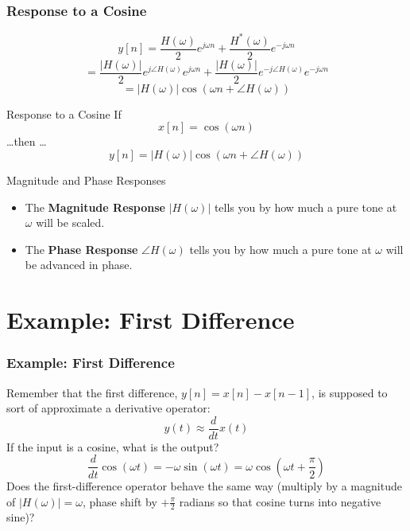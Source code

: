 \documentclass{beamer}
\begin{document}
\begin{frame}
  \frametitle{Response to a Cosine}
  \[
  y[n] = \frac{H(\omega)}{2}e^{j\omega n}+\frac{H^*(\omega)}{2}e^{-j\omega n}
  \]
  \[
  = \frac{|H(\omega)|}{2}e^{j\angle H(\omega)}e^{j\omega n} + 
  \frac{|H(\omega)|}{2}e^{-j\angle H(\omega)}e^{-j\omega n}
  \]
  \[
  = |H(\omega)|\cos\left(\omega n+\angle H(\omega)\right)
  \]
\end{frame}


\begin{frame}
  \begin{block}{Response to a Cosine}
    If
    \[
    x[n] = \cos(\omega n)
    \]
    \ldots then \ldots
    \[
    y[n] = |H(\omega)|\cos\left(\omega n+\angle H(\omega)\right)
    \]
  \end{block}
  \begin{block}{Magnitude and Phase Responses}
    \begin{itemize}
    \item The {\bf Magnitude Response} $|H(\omega)|$ tells you by how
      much a pure tone at $\omega$ will be scaled.
    \item The {\bf Phase Response} $\angle H(\omega)$ tells you by how much
      a pure tone at $\omega$ will be advanced in phase.
    \end{itemize}
  \end{block}
\end{frame}


\section[Example]{Example: First Difference}
\setcounter{subsection}{1}

\begin{frame}
  \frametitle{Example: First Difference}

  Remember that the first difference, $y[n]=x[n]-x[n-1]$, is supposed
  to sort of approximate a derivative operator:
  \[
  y(t) \approx \frac{d}{dt} x(t)
  \]
  If the input is a cosine, what is the output?
  \[
  \frac{d}{dt} \cos\left(\omega t\right) = -\omega \sin\left(\omega t\right)
  = \omega \cos\left(\omega t+\frac{\pi}{2}\right)
  \]
  Does the first-difference operator behave the same way (multiply by
  a magnitude of $|H(\omega)|=\omega$, phase shift by $+\frac{\pi}{2}$
  radians so that cosine turns into negative sine)?
\end{frame}
\end{document}
